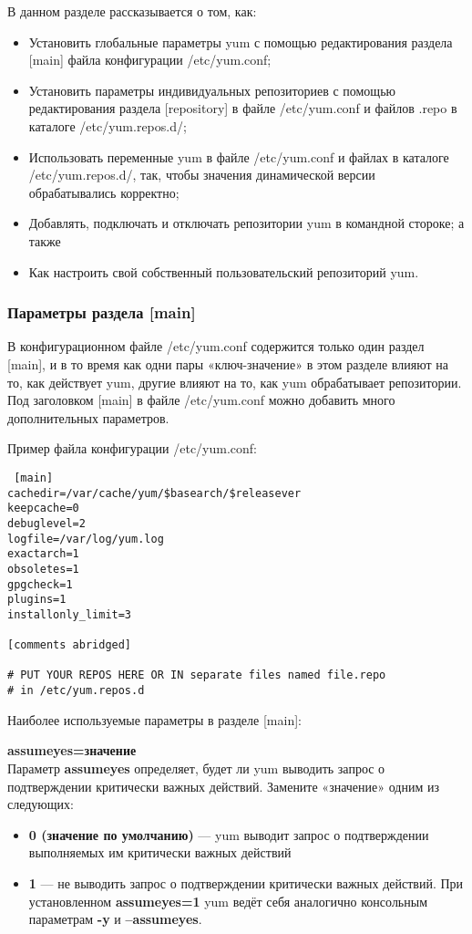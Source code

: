 \documentclass[a4paper,10pt,twoside]{article}
\begin{document}
В данном разделе рассказывается о том, как:
\begin{itemize}
 \item Установить глобальные параметры yum с помощью редактирования раздела [main] файла конфигурации /etc/yum.conf;
\item Установить параметры индивидуальных репозиториев с помощью редактирования раздела [repository] в файле /etc/yum.conf и файлов .repo в каталоге /etc/yum.repos.d/;
\item Использовать  переменные yum в файле /etc/yum.conf и  файлах в каталоге /etc/yum.repos.d/, так, чтобы значения динамической версии обрабатывались корректно;
\item Добавлять, подключать и отключать репозитории yum в командной стороке; а также
\item Как настроить свой собственный пользовательский репозиторий yum.
\end{itemize}

\subsubsection{Параметры раздела [main]}
В конфигурационном файле /etc/yum.conf содержится только один раздел [main], и в то время как одни пары «ключ-значение» в этом разделе влияют на то, как действует yum, другие влияют на то, как yum обрабатывает репозитории. Под заголовком [main] в файле /etc/yum.conf можно добавить много дополнительных параметров.

Пример файла конфигурации /etc/yum.conf:
\begin{verbatim}
 [main]
cachedir=/var/cache/yum/$basearch/$releasever
keepcache=0
debuglevel=2
logfile=/var/log/yum.log
exactarch=1
obsoletes=1
gpgcheck=1
plugins=1
installonly_limit=3

[comments abridged]

# PUT YOUR REPOS HERE OR IN separate files named file.repo
# in /etc/yum.repos.d
\end{verbatim} 


Наиболее используемые параметры в разделе [main]:

\textbf{assumeyes=значение}\\
Параметр \textbf{assumeyes} определяет, будет ли yum выводить запрос о подтверждении критически важных действий. Замените «значение» одним из следующих:
\begin{itemize}
\item \textbf{0 (значение по умолчанию)} — yum выводит запрос о подтверждении выполняемых им критически важных действий
\item \textbf{1} — не выводить запрос о подтверждении критически важных действий. При установленном \textbf{assumeyes=1} yum ведёт себя аналогично консольным параметрам \textbf{-y} и \textbf{--assumeyes}.
\end{itemize}
\end{document}
